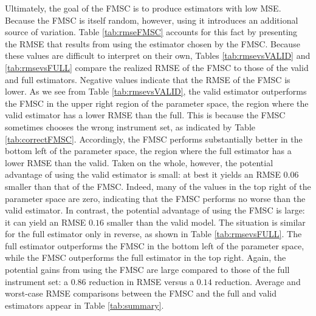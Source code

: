 \documentclass[12pt]{article}
\theoremstyle{definition}
\begin{document}
Ultimately, the goal of the FMSC is to produce estimators with low MSE. Because the FMSC is itself random, however, using it introduces an additional source of variation. Table \ref{tab:rmseFMSC} accounts for this fact by presenting the RMSE that results from using the estimator chosen by the FMSC. Because these values are difficult to interpret on their own, Tables \ref{tab:rmsevsVALID} and \ref{tab:rmsevsFULL} compare the realized RMSE of the FMSC to those of the valid and full estimators. Negative values indicate that the RMSE of the FMSC is lower. As we see from Table \ref{tab:rmsevsVALID}, the valid estimator outperforms the FMSC in the upper right region of the parameter space, the region where the valid estimator has a lower RMSE than the full. This is because the FMSC sometimes chooses the wrong instrument set, as indicated by Table \ref{tab:correctFMSC}. Accordingly, the FMSC performs substantially better in the bottom left of the parameter space, the region where the full estimator has a lower RMSE than the valid. Taken on the whole, however, the potential advantage of using the valid estimator is small: at best it yields an RMSE $0.06$ smaller than that of the FMSC. Indeed, many of the values in the top right of the parameter space are zero, indicating that the FMSC performs no worse than the valid estimator. In contrast, the potential advantage of using the FMSC is large: it can yield an RMSE $0.16$ smaller than the valid model. The situation is similar for the full estimator only in reverse, as shown in Table \ref{tab:rmsevsFULL}. The full estimator outperforms the FMSC in the bottom left of the parameter space, while the FMSC outperforms the full estimator in the top right. Again, the potential gains from using the FMSC are large compared to those of the full instrument set: a $0.86$ reduction in RMSE versus a $0.14$ reduction. Average and worst-case RMSE comparisons between the FMSC and the full and valid estimators appear in Table \ref{tab:summary}.
%
\end{document}
